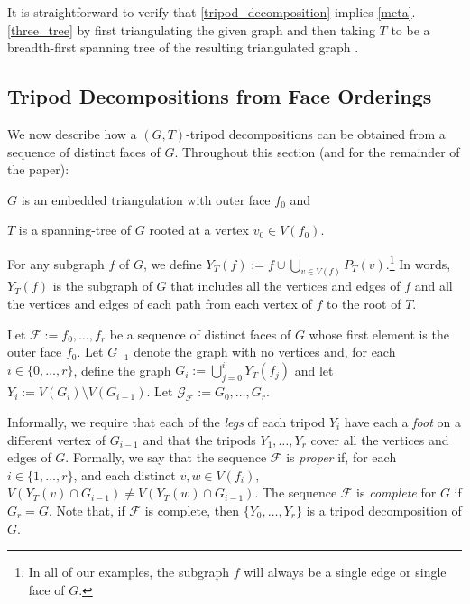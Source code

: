 \documentclass{patmorin}
\begin{document}
It is straightforward to verify that \cref{tripod_decomposition} implies \cref{meta}.\ref{three_tree} by first triangulating the given graph and then taking $T$ to be a breadth-first spanning tree of the resulting triangulated graph \cite[Observation~35]{dujmovic.joret.ea:planar}.


\subsection{Tripod Decompositions from Face Orderings}
\label{orderings}

We now describe how a $(G,T)$-tripod decompositions can be obtained from a sequence of distinct faces of $G$.  Throughout this section (and for the remainder of the paper):
\begin{compactitem}
   \item $G$ is an embedded triangulation with outer face $f_0$ and
   \item $T$ is a spanning-tree of $G$ rooted at a vertex $v_0\in V(f_0)$.
\end{compactitem}
For any subgraph $f$ of $G$, we define $Y_T(f):=f\cup \bigcup_{v\in V(f)} P_T(v)$.\footnote{In all of our examples, the subgraph $f$ will always be a single edge or single face of $G$.}  In words, $Y_T(f)$ is the subgraph of $G$ that includes all the vertices and edges of $f$ and all the vertices and edges of each path from each vertex of $f$ to the root of $T$.

Let $\mathcal{F}:=f_0,\ldots,f_{r}$ be a sequence of distinct faces of $G$ whose first element is the outer face $f_0$. Let $G_{-1}$ denote the graph with no vertices and, for each $i\in\{0,\ldots,r\}$, define the graph $G_i:=\bigcup_{j=0}^i Y_T(f_j)$ and let $Y_i:=V(G_i)\setminus V(G_{i-1})$.  Let $\mathcal{G_F}:= G_0,\ldots,G_{r}$.  

Informally, we require that each of the \emph{legs} of each tripod $Y_i$ have each a \emph{foot} on a different vertex of $G_{i-1}$ and that the tripods $Y_1,\ldots,Y_r$ cover all the vertices and edges of $G$. Formally, we say that the sequence $\mathcal{F}$ is \emph{proper} if, for each $i\in\{1,\ldots,r\}$, and each distinct $v,w\in V(f_i)$, $V(Y_T(v)\cap G_{i-1})\neq V(Y_T(w)\cap G_{i-1})$.  The sequence $\mathcal{F}$ is \emph{complete} for $G$ if $G_r=G$.  Note that, if $\mathcal{F}$ is complete, then $\{Y_0,\ldots,Y_r\}$ is a tripod decomposition of $G$.
\end{document}
